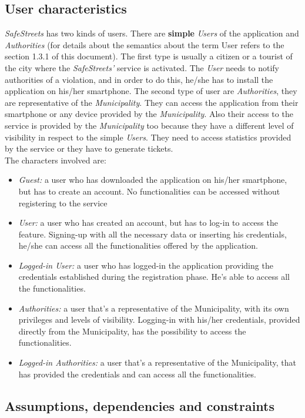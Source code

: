 \documentclass {article}
\begin{document}
	\subsection{User characteristics}
	{\it SafeStreets} has two kinds of users. There are  {\bf simple }{\it Users} of the application and {\it Authorities} (for details about the semantics about the term User refers to the section 1.3.1 of this document). The first type is usually a citizen or a tourist of the city where the {\it SafeStreets'} service is activated. The {\it User} needs to notify authorities of a violation,  and in order to do this, he/she has to install the application on his/her smartphone. The second type of user are {\it Authorities}, they are representative of the {\it Municipality}. They can access the application from their smartphone or any device provided by the {\it Municipality}. Also their access to the service is provided by the {\it Municipality} too because they have a different level of visibility in respect to the simple {\it Users}. They need to access statistics provided by the service or they have to generate tickets. \\
	The characters involved are:
	\begin{itemize}
		\item {\it Guest:} a user who has downloaded the application on his/her smartphone, but has to create an account. No functionalities can be accessed without registering to the service
		\item {\it User:} a user who has created an account, but has to log-in to access the feature. Signing-up with all the necessary data or inserting his credentials, he/she can access all the functionalities offered by the application.
		\item {\it Logged-in User:} a user who has logged-in the application providing the credentials established during the registration phase. He's able to access all the functionalities. 
		\item {\it Authorities:} a user that's a representative of the Municipality, with its own privileges and levels of visibility. Logging-in with his/her credentials, provided directly from the Municipality, has the possibility to access the functionalities.
		\item {\it Logged-in Authorities:} a user that's a representative of the Municipality, that has provided the credentials and can access all the functionalities.
	\end{itemize}
	\pagebreak
	
	\subsection{Assumptions, dependencies and constraints}
\end{document}
